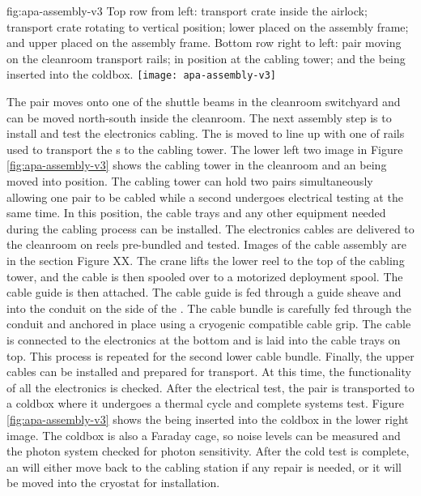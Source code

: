 \begin{dunefigure}{fig:apa-assembly-v3}
  {Top row from left:   transport crate inside the airlock;  transport crate rotating to vertical position;  lower  placed on the  assembly frame; and upper  placed on the assembly frame. Bottom row right to left:  pair moving on the cleanroom transport rails;  in  position at the cabling tower; and the  being inserted into the coldbox.}
\texttt{[image: apa-assembly-v3]}

\end{dunefigure}

The  pair moves onto one of the shuttle beams in the cleanroom switchyard and can be moved north-south inside the cleanroom. The next assembly step is to install and test the electronics cabling. The  is moved to line up with one of rails used to transport the s to the  cabling tower. The lower left two image in Figure \ref{fig:apa-assembly-v3} shows the  cabling tower in the cleanroom and an  being moved into position. The  cabling tower can hold two  pairs simultaneously allowing one  pair to be cabled while a second  undergoes electrical testing at the same time. In this position, the cable trays and any other equipment needed during the cabling process can be installed. The electronics cables are delivered to the cleanroom on reels pre-bundled and tested. Images of the cable assembly are in the  section Figure XX.
The crane lifts the lower  reel  to the top of the  cabling tower, and the cable is then spooled over to a motorized deployment spool. The cable guide is then attached.  The cable guide is fed through a guide sheave and into the conduit on the side of the . The cable bundle is carefully fed through the conduit and anchored in place using a cryogenic compatible cable grip. The cable is connected to the electronics at the bottom and is laid into the cable trays on top. This process is repeated for the second lower  cable bundle. Finally, the upper cables can be installed and prepared for transport. At this time, the functionality of all the electronics is checked. After the  electrical test, the  pair is transported to a coldbox where it undergoes a thermal cycle and complete systems test. Figure \ref{fig:apa-assembly-v3} shows the  being inserted into the coldbox in the lower right image. The coldbox is also a Faraday cage, so noise levels can be measured and the photon system checked for photon sensitivity. After the cold test is complete, an  will either move back to the cabling station if any repair is needed, or it will be moved into the cryostat for installation. 



